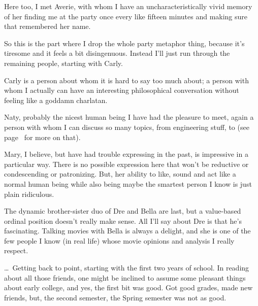 \documentclass[./butidigress.tex]{subfiles}
\begin{document}
\vspace{1em}

Here too, I met Averie, with whom I have an uncharacteristically vivid memory of her finding me at the party once every like fifteen minutes and making sure that remembered her name.

So this is the part where I drop the whole party metaphor thing, because it's tiresome and it feels a bit disingenuous.
Instead I'll just run through the remaining people, starting with Carly.

Carly is a person about whom it is hard to say too much about; a person with whom I actually can have an interesting philosophical conversation without feeling like a goddamn charlatan.

Naty, probably the nicest human being I have had the pleasure to meet, again a person with whom I can discuss so many topics, from engineering stuff, to  (see page~\pageref{chap:sincerity} for more on that).

Mary, I believe, but have had trouble expressing in the past, is impressive in a particular way.
There is no possible expression here that won't be reductive or condescending or patronizing.
But, her ability to like, sound and act like a normal human being while also being maybe the smartest person I know is just plain ridiculous.

The dynamic brother-sister duo of Dre and Bella are last, but a value-based ordinal position doesn't really make sense.
All I'll say about Dre is that he's fascinating.
Talking movies with Bella is always a delight, and she is one of the few people I know (in real life) whose movie opinions and analysis I really respect.

\vspace*{\baselineskip}

\ldots\ Getting back to point, starting with the first two years of school.
In reading about all those friends, one might be inclined to assume some pleasant things about early college, and yes, the first bit was good.
Got good grades, made new friends, but, the second semester, the Spring semester was not as good.
\end{document}
